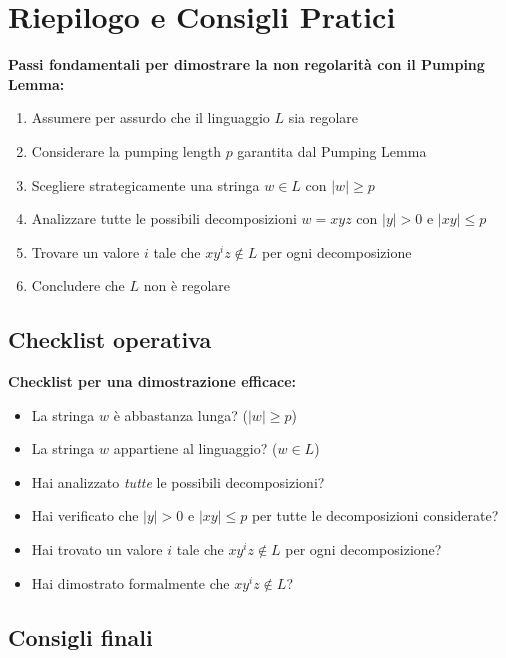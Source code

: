 \documentclass[12pt,a4paper]{article}
\begin{document}
\section{Riepilogo e Consigli Pratici}

\begin{concettochiave}
\textbf{Passi fondamentali per dimostrare la non regolarità con il Pumping Lemma:}
\begin{enumerate}
    \item Assumere per assurdo che il linguaggio $L$ sia regolare
    \item Considerare la pumping length $p$ garantita dal Pumping Lemma
    \item Scegliere strategicamente una stringa $w \in L$ con $|w| \geq p$
    \item Analizzare tutte le possibili decomposizioni $w = xyz$ con $|y| > 0$ e $|xy| \leq p$
    \item Trovare un valore $i$ tale che $xy^iz \not\in L$ per ogni decomposizione
    \item Concludere che $L$ non è regolare
\end{enumerate}
\end{concettochiave}

\subsection{Checklist operativa}

\begin{risoluzione}
\textbf{Checklist per una dimostrazione efficace:}
\begin{itemize}
    \item La stringa $w$ è abbastanza lunga? ($|w| \geq p$)
    \item La stringa $w$ appartiene al linguaggio? ($w \in L$)
    \item Hai analizzato \emph{tutte} le possibili decomposizioni?
    \item Hai verificato che $|y| > 0$ e $|xy| \leq p$ per tutte le decomposizioni considerate?
    \item Hai trovato un valore $i$ tale che $xy^iz \not\in L$ per ogni decomposizione?
    \item Hai dimostrato formalmente che $xy^iz \not\in L$?
\end{itemize}
\end{risoluzione}

\subsection{Consigli finali}
\end{document}
